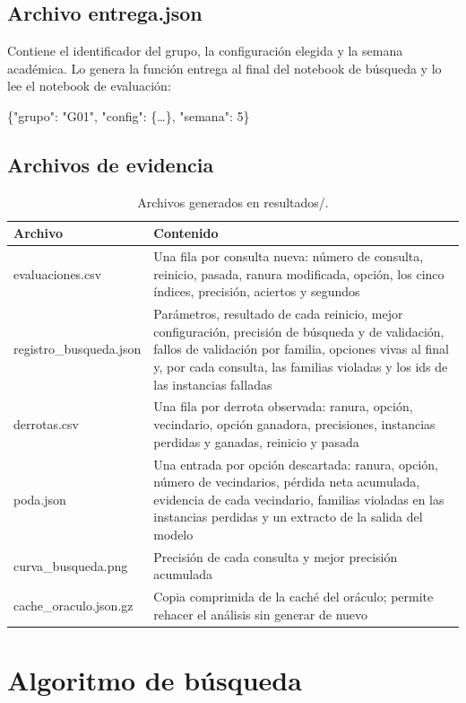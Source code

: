 \documentclass[12pt,letterpaper]{article}
\theoremstyle{definition}
\begin{document}
\subsection{Archivo entrega.json}
Contiene el identificador del grupo, la configuración elegida y la semana académica. Lo genera la función entrega al final del notebook de búsqueda y lo lee el notebook de evaluación:
\begin{center}
\{"grupo": "G01", "config": \{\dots\}, "semana": 5\}
\end{center}

\subsection{Archivos de evidencia}

\begin{table}[H]
\caption{Archivos generados en resultados/.}
\begin{tabularx}{\textwidth}{@{}p{4.4cm}L@{}}
\toprule
Archivo & Contenido \\
\midrule
evaluaciones.csv & Una fila por consulta nueva: número de consulta, reinicio, pasada, ranura modificada, opción, los cinco índices, precisión, aciertos y segundos \\
registro\_busqueda.json & Parámetros, resultado de cada reinicio, mejor configuración, precisión de búsqueda y de validación, fallos de validación por familia, opciones vivas al final y, por cada consulta, las familias violadas y los ids de las instancias falladas \\
derrotas.csv & Una fila por derrota observada: ranura, opción, vecindario, opción ganadora, precisiones, instancias perdidas y ganadas, reinicio y pasada \\
poda.json & Una entrada por opción descartada: ranura, opción, número de vecindarios, pérdida neta acumulada, evidencia de cada vecindario, familias violadas en las instancias perdidas y un extracto de la salida del modelo \\
curva\_busqueda.png & Precisión de cada consulta y mejor precisión acumulada \\
cache\_oraculo.json.gz & Copia comprimida de la caché del oráculo; permite rehacer el análisis sin generar de nuevo \\
\bottomrule
\end{tabularx}
\end{table}

\section{Algoritmo de búsqueda}
\end{document}
